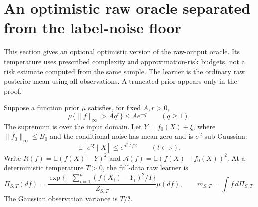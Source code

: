 \section{An optimistic raw oracle separated from the label-noise floor}
\label{sec:optimistic-raw-temperature}
This section gives an optional optimistic version of the raw-output oracle. Its temperature uses prescribed complexity and approximation-risk budgets, not a risk estimate computed from the same sample. The learner is the ordinary raw posterior mean using all observations. A truncated prior appears only in the proof.

Suppose a function prior $\mu$ satisfies, for fixed $A,r>0$,
\begin{equation}
 \mu\{\|f\|_\infty>Aq^r\}\le A e^{-q}
                  \qquad(q\ge1).
 \label{eq:optimistic-native-tail}
\end{equation}
The supremum is over the input domain. Let $Y=f_0(X)+\xi$, where $\|f_0\|_\infty\le B_0$ and the conditional noise has mean zero and is $\sigma^2$-sub-Gaussian:
\[
 \mathbb E[e^{t\xi}\mid X]\le e^{\sigma^2t^2/2}
                         \qquad(t\in\mathbb R).
\]
Write $R(f)=\mathbb E(f(X)-Y)^2$ and
$\mathcal A(f)=\mathbb E(f(X)-f_0(X))^2$.
At a deterministic temperature $T>0$, the full-data raw learner is
\[
 \Pi_{S,T}(df)=\frac{\exp\{-\sum_{i=1}^n(f(X_i)-Y_i)^2/T\}}{Z_{S,T}}\mu(df),
 \qquad m_{S,T}=\int f\,d\Pi_{S,T}.
\]
The Gaussian observation variance is $T/2$.

